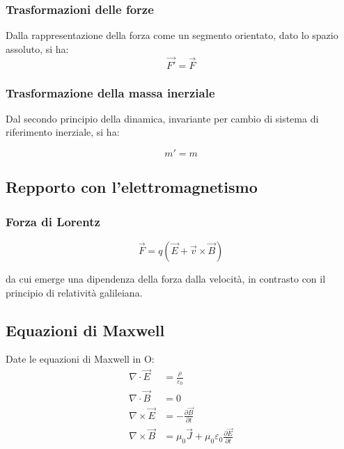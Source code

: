 \documentclass{article}
\begin{document}
\subsubsection{Trasformazioni delle forze}
Dalla rappresentazione della forza come un segmento orientato, dato lo spazio assoluto, si ha:
\begin{equation}
    \vec{F'} = \vec{F}
\end{equation}

\subsubsection{Trasformazione della massa inerziale}
Dal secondo principio della dinamica, invariante per cambio di sistema di riferimento inerziale, si ha:

\begin{equation}
    m' = m
\end{equation}


\subsection{Repporto con l'elettromagnetismo}

\subsubsection{Forza di Lorentz}
\begin{equation}
    \vec{F} = q(\vec{E} + \vec{v} \times \vec{B})
\end{equation}

da cui emerge una dipendenza della forza dalla velocità, in contrasto con il principio di relatività galileiana.

\subsection*{Equazioni di Maxwell}
Date le equazioni di Maxwell in O:
\begin{equation}
\begin{aligned}
    \nabla \cdot \vec{E} &= \frac{\rho}{\varepsilon_0} \\
    \nabla \cdot \vec{B} &= 0 \\
    \nabla \times \vec{E} &= -\frac{\partial \vec{B}}{\partial t} \\
    \nabla \times \vec{B} &= \mu_0 \vec{J} + \mu_0 \varepsilon_0 \frac{\partial \vec{E}}{\partial t}
\end{aligned}
\end{equation}
\end{document}
